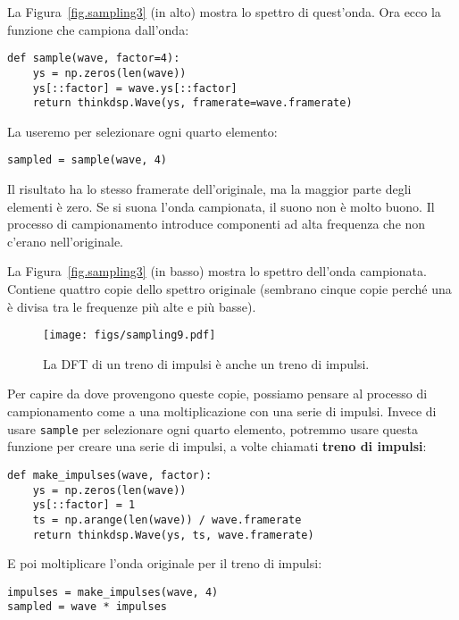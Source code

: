 \documentclass[12pt]{book} \usepackage[width=5.5in,height=8.5in, hmarginratio=3:2,vmarginratio=1:1]{geometry}
\begin{document}
La Figura~\ref{fig.sampling3} (in alto) mostra lo spettro di quest'onda. Ora ecco la funzione che campiona dall'onda:

\begin{verbatim} 
def sample(wave, factor=4):
    ys = np.zeros(len(wave))
    ys[::factor] = wave.ys[::factor]
    return thinkdsp.Wave(ys, framerate=wave.framerate)
 \end{verbatim} 

La useremo per selezionare ogni quarto elemento:

\begin{verbatim} 
sampled = sample(wave, 4)
 \end{verbatim} 

Il risultato ha lo stesso framerate dell'originale, ma la maggior parte degli elementi è zero. Se si suona l'onda campionata, il suono non è molto buono. Il processo di campionamento introduce componenti ad alta frequenza che non c'erano nell'originale.

La Figura~\ref{fig.sampling3} (in basso) mostra lo spettro dell'onda campionata. Contiene quattro copie dello spettro originale (sembrano cinque copie perché una è divisa tra le frequenze più alte e più basse).

\begin{figure} 

\centerline{\texttt{[image: figs/sampling9.pdf]}} \caption{La DFT di un treno di impulsi è anche un treno di impulsi.} \label{fig.sampling9} \end{figure} 

Per capire da dove provengono queste copie, possiamo pensare al processo di campionamento come a una moltiplicazione con una serie di impulsi. Invece di usare {\tt sample} per selezionare ogni quarto elemento, potremmo usare questa funzione per creare una serie di impulsi, a volte chiamati {\bf treno di impulsi}:

\begin{verbatim} 
def make_impulses(wave, factor):
    ys = np.zeros(len(wave))
    ys[::factor] = 1
    ts = np.arange(len(wave)) / wave.framerate
    return thinkdsp.Wave(ys, ts, wave.framerate)
 \end{verbatim} 

E poi moltiplicare l'onda originale per il treno di impulsi:

\begin{verbatim} 
impulses = make_impulses(wave, 4)
sampled = wave * impulses
 \end{verbatim} 
\end{document}
